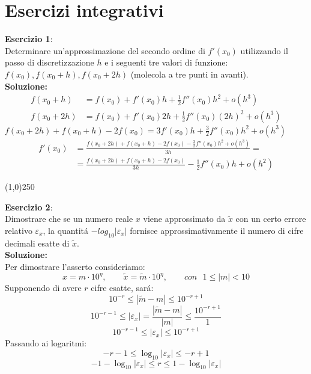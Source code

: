 \chapter{Esercizi integrativi}
\qquad
\textbf{Esercizio 1}:\\Determinare un'approssimazione del secondo ordine
di $f'(x_0)$ utilizzando il passo di discretizzazione $h$ e i seguenti tre valori
di funzione: $f(x_0),f(x_0+h),f(x_0+2h)$ (molecola a tre punti in avanti).\\

\textbf{Soluzione:} \begin{equation*} \begin{split}
f(x_0 + h) &= f(x_0) + f'(x_0)h + \frac{1}{2}f''(x_0)h^2 + o(h^3)\\
f(x_0 + 2h) &= f(x_0)+f'(x_0)2h + \frac{1}{2}f''(x_0)(2h)^2 + o(h^3) \end{split}
\end{equation*} $f(x_0 + 2h) + f(x_0+h) - 2f(x_0) = 3f'(x_0)h +
\frac{3}{2}f''(x_0)h^2 + o(h^3)$ \begin{equation*} \begin{split} f'(x_0) &=
\frac{f(x_0 + 2h)+f(x_0+h)-2f(x_0)-\frac{3}{2}f''(x_0)h^2 + o(h^3)}{3h} =\\ &=
\frac{f(x_0 +2h)+f(x_0+h)-2f(x_0)}{3h}-\frac{1}{2}f''(x_0)h + o(h^2) \end{split}
\end{equation*}

\begin{center}
\line(1,0){250}
\end{center}

\textbf{Esercizio 2}:\\Dimostrare che se un numero reale $x$ viene approssimato
da $\tilde{x}$ con un certo errore relativo $\varepsilon_x$, la quantit\'a
$-log_{10}{|\varepsilon_x|}$ fornisce approssimativamente il numero di cifre
decimali esatte di $\tilde{x}$.\\

\textbf{Soluzione:}\\Per dimostrare l'asserto consideriamo: 
$$x=m\cdot10^{\eta},\qquad \tilde{x}=\tilde{m}\cdot10^{\eta}, \qquad con\:\:\:
1\leq|m|<10$$
Supponendo di avere $r$ cifre esatte, sar\'a:
$$10^{-r}\leq|\tilde{m}-m|\leq10^{-r+1}$$
$$10^{-r-1}\leq|\varepsilon_x|=\frac{|\tilde{m}-m|}{|m|}\leq\frac{10^{-r+1}}{1}$$
$$10^{-r-1}\leq|\varepsilon_x|\leq10^{-r+1}$$
Passando ai logaritmi:
$$-r-1\leq\log_{10}{|\varepsilon_x|}\leq-r+1$$
$$-1-\log_{10}{|\varepsilon_x|}\leq r\leq
1-\log_{10}{|\varepsilon_x|}$$

